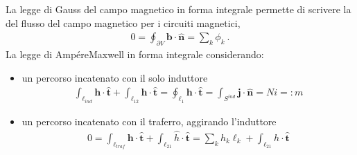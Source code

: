 \documentclass[letterpaper,10pt,italian]{jupyterBook}
\begin{document}
\sphinxAtStartPar
La legge di Gauss del campo magnetico in forma integrale permette di scrivere la  del flusso del campo magnetico per i circuiti magnetici,
\begin{equation*}
\begin{split}0 = \oint_{\partial V} \mathbf{b} \cdot \hat{\mathbf{n}} = \sum_k \phi_k \ .\end{split}
\end{equation*}
\sphinxAtStartPar
La legge di Ampére\sphinxhyphen{}Maxwell in forma integrale considerando:
\begin{itemize}
\item {} 
\sphinxAtStartPar
un percorso incatenato con il solo induttore
\begin{equation*}
\begin{split}\int_{\ell_{ind}} \mathbf{h} \cdot \hat{\mathbf{t}} + \int_{\ell_{12}} \mathbf{h} \cdot \hat{\mathbf{t}} = \oint_{\ell_{1}} \mathbf{h} \cdot \hat{\mathbf{t}} = \int_{S^{ind}} \mathbf{j} \cdot \hat{\mathbf{n}} =  N i =: m\end{split}
\end{equation*}
\item {} 
\sphinxAtStartPar
un percorso incatenato con il traferro, aggirando l’induttore
\begin{equation*}
\begin{split}0 = \int_{\ell_{traf}} \mathbf{h} \cdot \hat{\mathbf{t}} + \int_{\ell_{21}} \hat{h} \cdot \hat{\mathbf{t}} = \sum_{k} h_k \ell_k + \int_{\ell_{21}} \hat{h} \cdot \hat{\mathbf{t}}\end{split}
\end{equation*}
\end{itemize}
\end{document}
